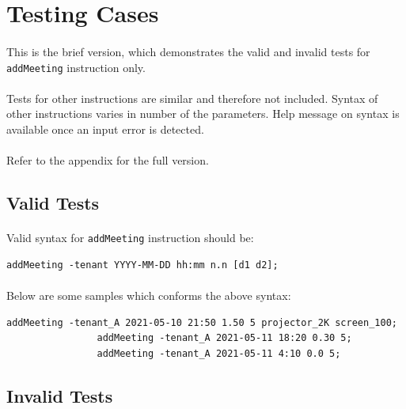 \documentclass{article}
\begin{document}
    \section{Testing Cases}
        \paragraph{}
        This is the brief version, which demonstrates the valid and invalid tests for \texttt{addMeeting} instruction only.
        \paragraph{}
        Tests for other instructions are similar and therefore not included. Syntax of other instructions varies in
        number of the parameters. Help message on syntax is available once an input error is detected.
        \paragraph{}
        Refer to the appendix for the full version. 

        \subsection{Valid Tests}
            \paragraph{}
            Valid syntax for \texttt{addMeeting} instruction should be:
            \begin{Verbatim}[gobble=8]
                addMeeting -tenant YYYY-MM-DD hh:mm n.n [d1 d2]; 
            \end{Verbatim}
            \paragraph{}
            Below are some samples which conforms the above syntax:
            \begin{Verbatim}[gobble=8]
                addMeeting -tenant_A 2021-05-10 21:50 1.50 5 projector_2K screen_100;
                addMeeting -tenant_A 2021-05-11 18:20 0.30 5;
                addMeeting -tenant_A 2021-05-11 4:10 0.0 5;
            \end{Verbatim}
        
        
        \subsection{Invalid Tests}
\end{document}
